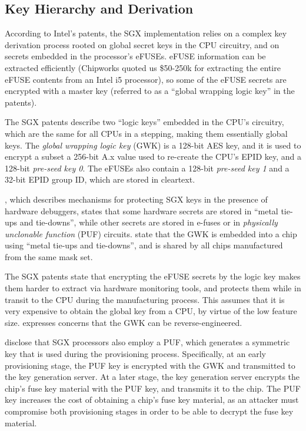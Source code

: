 \subsection{Key Hierarchy and Derivation}



According to Intel's patents, the SGX implementation relies on a complex key
derivation process rooted on global secret keys in the CPU circuitry, and on
secrets embedded in the processor's eFUSEs. eFUSE information can be extracted
efficiently (Chipworks quoted us \$50-250k for extracting the entire eFUSE
contents from an Intel i5 processor), so some of the eFUSE secrets are
encrypted with a master key (referred to as a ``global wrapping logic key'' in
the patents).

The SGX patents describe two ``logic keys'' embedded in the CPU's circuitry,
which are the same for all CPUs in a stepping, making them essentially global
keys. The \textit{global wrapping logic key} (GWK) is a 128-bit AES key, and it is
used to encrypt a subset a 256-bit A.x value used to re-create the CPU's EPID
key, and a 128-bit \textit{pre-seed key 0}. The eFUSEs also contain a 128-bit
\textit{pre-seed key 1} and a 32-bit EPID group ID, which are stored in
cleartext.

\cite{shanbhogue2015gdxcsgx}, which describes mechanisms for protecting SGX
keys in the presence of hardware debuggers, states that some hardware secrets
are stored in ``metal tie-ups and tie-downs'', while other secrets are stored
in e-fuses or in \textit{physically unclonable function} (PUF) circuits.
\cite{brickell2014hardening, gotze2014provisioning} state that the GWK is
embedded into a chip using ``metal tie-ups and tie-downs'', and is shared by
all chips manufactured from the same mask set.

The SGX patents state that encrypting the eFUSE secrets by the logic key makes
them harder to extract via hardware monitoring tools, and protects them while
in transit to the CPU during the manufacturing process. This assumes that it is
very expensive to obtain the global key from a CPU, by virtue of the low
feature size. \cite{gotze2014provisioning} expresses concerns that the GWK can
be reverse-engineered.

\cite{gotze2014provisioning, gotze2014provisioning2} disclose that SGX
processors also employ a PUF, which generates a symmetric key that is used
during the provisioning process.  Specifically, at an early provisioning stage,
the PUF key is encrypted with the GWK and transmitted to the key generation
server. At a later stage, the key generation server encrypts the chip's fuse
key material with the PUF key, and transmits it to the chip. The PUF key
increases the cost of obtaining a chip's fuse key material, as an attacker must
compromise both provisioning stages in order to be able to decrypt the fuse key
material.


